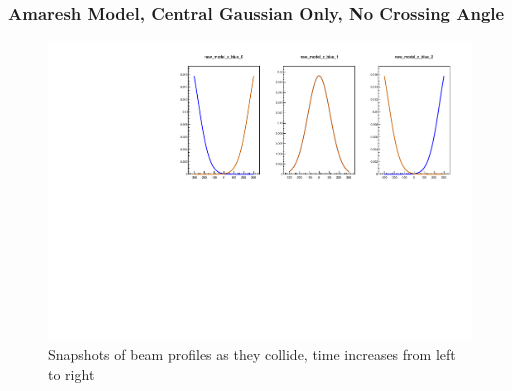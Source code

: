 \begin{frame}
\frametitle{Amaresh Model, Central Gaussian Only, No Crossing Angle }
\begin{figure}
\begin{center}
\includegraphics[width=\linewidth]{../OverlapTest/figs/359711_model1c_noangle_zprofile.pdf}
\end{center}
\caption{Snapshots of beam profiles as they collide, time increases from left to right }
\label{fig:359711_model1c_noangle_zprofile}
\end{figure}
\end{frame}

